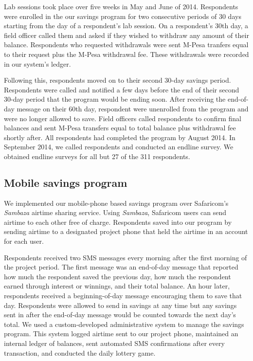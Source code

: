 \documentclass[10pt]{article}
\begin{document}
	Lab sessions took place over five weeks in May and June of 2014. Respondents were enrolled in the our savings program for two consecutive periods of 30 days starting from the day of a respondent’s lab session. On a respondent’s 30th day, a field officer called them and asked if they wished to withdraw any amount of their balance. Respondents who requested withdrawals were sent M-Pesa tranfers equal to their request plus the M-Pesa withdrawal fee. These withdrawals were recorded in our system’s ledger. 

	Following this, respondents moved on to their second 30-day savings period. Respondents were called and notified a few days before the end of their second 30-day period that the program would be ending soon. After receiving the end-of-day message on their 60th day, respondent were unenrolled from the program and were no longer allowed to save. Field officers called respondents to confirm final balances and sent M-Pesa transfers equal to total balance plus withdrawal fee shortly after. All respondents had completed the program by August 2014. In September 2014, we called respondents and conducted an endline survey. We obtained endline surveys for all but 27 of the 311 respondents.

	\subsection{Mobile savings program}
		
		We implemented our mobile-phone based savings program over Safaricom's \textit{Sambaza} airtime sharing service. Using \textit{Sambaza}, Safaricom users can send airtime to each other free of charge. Respondents saved into our program by sending airtime to a designated project phone that held the airtime in an account for each user.

		Respondents received two SMS messages every morning after the first morning of the project period. The first message was an end-of-day message that reported how much the respondent saved the previous day, how much the respondent earned through interest or winnings, and their total balance. An hour later, respondents received a beginning-of-day message encouraging them to save that day. Respondents were allowed to send in savings at any time but any savings sent in after the end-of-day message would be counted towards the next day’s total. We used a custom-developed administrative system to manage the savings program. This system logged airtime sent to our project phone, maintained an internal ledger of balances, sent automated SMS confirmations after every transaction, and conducted the daily lottery game.
\end{document}
